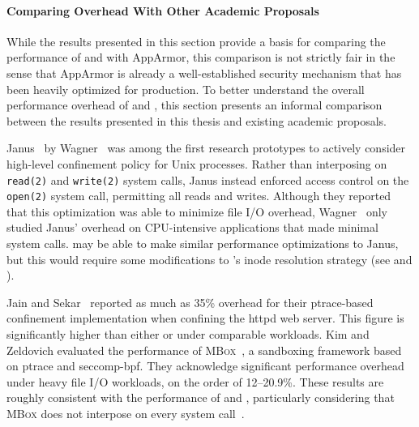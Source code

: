 \paragraph*{Comparing Overhead With Other Academic Proposals}
While the results presented in this section provide a basis for comparing the performance
of \bpfbox{} and \bpfcontain{} with AppArmor, this comparison is not strictly fair in the
sense that AppArmor is already a well-established security mechanism that has been heavily
optimized for production.  To better understand the overall performance overhead of
\bpfbox{} and \bpfcontain{}, this section presents an informal comparison between the
results presented in this thesis and existing academic proposals.


Janus~\cite{wagner1999_janus, goldberg96_janus} by Wagner \etal\ was among the first
research prototypes to actively consider high-level confinement policy for Unix processes.
Rather than interposing on \texttt{read(2)} and \texttt{write(2)} system calls, Janus
instead enforced access control on the \texttt{open(2)} system call, permitting all reads
and writes. Although they reported that this optimization was able to minimize file I/O
overhead, Wagner \etal\ only studied Janus' overhead on CPU-intensive applications that
made minimal system calls. \bpfcontain{} may be able to make similar performance
optimizations to Janus, but this would require some modifications to \bpfcontain{}'s inode
resolution strategy (see  and ).

Jain and Sekar~\cite{jain2000_filtering} reported as much as 35\% overhead for their
ptrace-based confinement implementation when confining the httpd web server. This figure is
significantly higher than either \bpfbox{} or \bpfcontain{} under comparable workloads.
Kim and Zeldovich evaluated the performance of \textsc{MBox}~\cite{kim2013_mbox},
a sandboxing framework based on ptrace and seccomp-bpf. They acknowledge significant
performance overhead under heavy file I/O workloads, on the order of 12--20.9\%. These
results are roughly consistent with the performance of \bpfbox{} and \bpfcontain{},
particularly considering that \textsc{MBox} does not interpose on every system
call~\cite{kim2013_mbox}.

